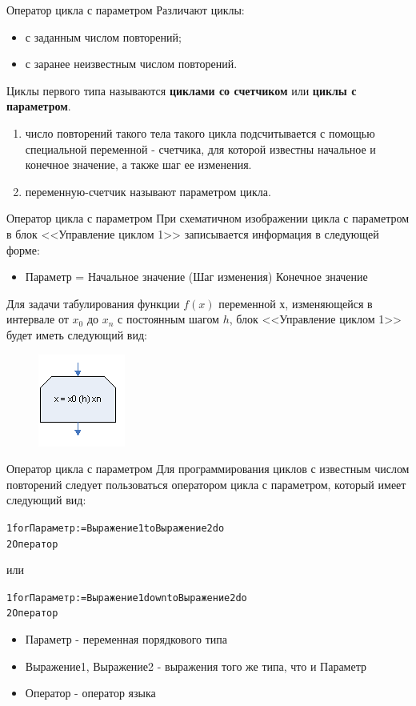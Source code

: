 \documentclass{beamer}
\begin{document}
\begin{frame}{Оператор цикла с параметром}
Различают циклы:
\begin{itemize}
\item с заданным числом повторений;
\item с заранее неизвестным числом повторений. 
\end{itemize}
Циклы первого типа называются \textbf{циклами со счетчиком} или \textbf{циклы с параметром}. 
\begin{enumerate}
\item число повторений такого тела такого цикла подсчитывается с помощью специальной переменной - счетчика, для которой известны начальное и конечное значение, а также шаг ее изменения.
\item переменную-счетчик называют параметром цикла.
\end{enumerate}
\end{frame}

\begin{frame}{Оператор цикла с параметром}
При схематичном изображении цикла с параметром в блок <<Управление циклом 1>> записывается информация в следующей форме:
\begin{itemize}
\item Параметр = Начальное значение (Шаг изменения) Конечное значение
\end{itemize}
Для задачи табулирования функции $f(x)$ переменной $х$, изменяющейся в интервале от $x_0$ до $x_n$ с постоянным шагом $h$, блок <<Управление циклом 1>> будет иметь следующий вид:
\begin{figure}[h]
\centering
\includegraphics[scale=1]{images/lec04-pic03.png}
\end{figure}
\end{frame}

\begin{frame}[fragile]{Оператор цикла с параметром}
Для программирования циклов с известным числом повторений следует пользоваться оператором цикла с параметром, который имеет следующий вид:
\begin{alltt}
1  for Параметр := Выражение1 to Выражение2 do
2     Оператор
\end{alltt}
или
\begin{alltt}
1  for Параметр := Выражение1 downto Выражение2 do
2     Оператор
\end{alltt}
\begin{itemize}
\item Параметр - переменная порядкового типа
\item Выражение1, Выражение2 - выражения того же типа, что и Параметр 
\item Оператор - оператор языка
\end{itemize}
\end{frame}
\end{document}
